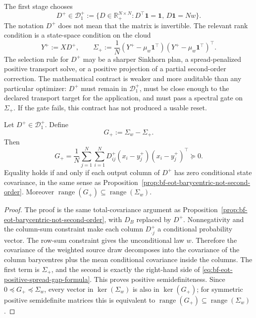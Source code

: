 The first stage chooses
\begin{equation}
\label{eq:bf-eot-positive-spread-transform}
  D^+\in\mathcal D_1^+
  :=
  \{D\in\mathbb R_+^{N\times N}:D^\top\mathbf 1=\mathbf 1,\,
  D\mathbf 1=Nw\}.
\end{equation}
The notation \(D^+\) does not mean that the matrix is invertible.  The relevant
rank condition is a state-space condition on the cloud
\[
  Y^+ := XD^+,
  \qquad
  \Sigma_+
  :=
  \frac1N
  (Y^+-\mu_w\mathbf 1^\top)(Y^+-\mu_w\mathbf 1^\top)^\top .
\]
The selection rule for \(D^+\) may be a sharper Sinkhorn plan, a spread-penalized
positive transport solve, or a positive projection of a partial second-order
correction.  The mathematical contract is weaker and more auditable than any
particular optimizer: \(D^+\) must remain in \(\mathcal D_1^+\), must be close
enough to the declared transport target for the application, and must pass a
spectral gate on \(\Sigma_+\).  If the gate fails, this contract has not produced
a usable reset.

\begin{proposition}
\label{prop:bf-eot-positive-spread-gap}
Let \(D^+\in\mathcal D_1^+\).  Define
\[
  G_+ := \Sigma_w-\Sigma_+ .
\]
Then
\begin{equation}
\label{eq:bf-eot-positive-spread-gap-formula}
  G_+
  =
  \frac1N
  \sum_{j=1}^N
  \sum_{i=1}^N
  D^+_{ij}
  (x_i-y^+_j)(x_i-y^+_j)^\top
  \succeq 0.
\end{equation}
Equality holds if and only if each output column of \(D^+\) has zero conditional
state covariance, in the same sense as
Proposition~\ref{prop:bf-eot-barycentric-not-second-order}.  Moreover
\(\operatorname{range}(G_+)\subseteq\operatorname{range}(\Sigma_w)\).
\end{proposition}

\begin{proof}
The proof is the same total-covariance argument as
Proposition~\ref{prop:bf-eot-barycentric-not-second-order}, with \(D_B\)
replaced by \(D^+\).  Nonnegativity and the column-sum constraint make each
column \(D^+_{\cdot j}\) a conditional probability vector.  The row-sum
constraint gives the unconditional law \(w\).  Therefore the covariance of the
weighted source draw decomposes into the covariance of the column barycentres
plus the mean conditional covariance inside the columns.  The first term is
\(\Sigma_+\), and the second is exactly the right-hand side of
\eqref{eq:bf-eot-positive-spread-gap-formula}.  This proves positive
semidefiniteness.  Since \(0\preceq G_+\preceq \Sigma_w\), every vector in
\(\ker(\Sigma_w)\) is also in \(\ker(G_+)\); for symmetric positive
semidefinite matrices this is equivalent to
\(\operatorname{range}(G_+)\subseteq\operatorname{range}(\Sigma_w)\).
\end{proof}

